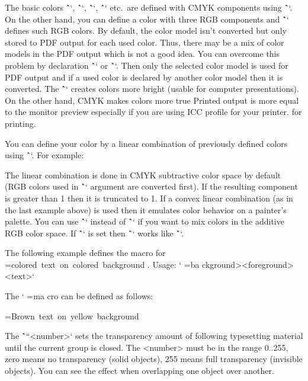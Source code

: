 {The basic colors \^`\Blue`, \^`\Red`, \^`\Cyan`, \^`\Yellow` etc.\ are defined
with CMYK components using \^`\setcmykcolor`.
On the other hand, you can define a color with three
RGB components and \^`\morecolors` defines such RGB colors.
By default, the color model isn't converted but only stored to
PDF output for each used color. Thus, there may be a mix of color
models in the PDF output which is not a good idea. You can overcome this
problem by declaration \^`\onlyrgb` or \^`\onlycmyk`. Then only the selected color
model is used for PDF output and if a used color is declared by another color
model then it is converted.
The \^`\onlyrgb` creates colors more bright (usable for computer
presentations). On the other hand, CMYK makes colors more true\fnote
{Printed output is more equal to the monitor preview especially if you are
using ICC profile for your printer.}
for printing.

You can define your color by a linear combination of previously defined colors using
\^``. For example:

\begtt
{} \myCyan {.3\Green + .5\Blue}  %
 \DarkBlue {\Blue + .4\Black}  %
 \myGreen{\Cyan+\Yellow}       %
{} \MyColor {.3\Orange+.5\Green+.2\Yellow}
\endtt
%
The linear combination is done in CMYK subtractive color space by default
(RGB colors used in \^`` argument are converted first).
If the resulting component is greater than 1 then it is truncated to 1.
If a convex linear combination (as in the last example above) is used then it
emulates color behavior on a painter's palette.
You can use \^`\rgbcolordef` instead of \^`` if you want to mix colors
in the additive RGB color space.
If \^`\onlyrgb` is set then \^`` works like \^`\rgbcolordef`.

\def\coloron#1#2#3{%
   \setbox0=\hbox{#2#3}\leavevmode
   \rlap{#1\strut \vrule width\wd0}
}
The following example defines the macro for
\coloron\Yellow\Brown{colored text on colored background}. Usage:
`\coloron<background><foreground>{<text>}`

The `\coloron` macro can be defined as follows:

\begtt
\def\coloron#1#2#3{%
   \setbox0=\hbox{#2#3}%
   \leavevmode \rlap{#1\strut \vrule width\wd0}
}
\coloron\Yellow\Brown{Brown text on yellow background}
\endtt

The \^`\transparency``<number>` sets the transparency amount of following
typesetting material until the current group is closed.
The <number> must be in the range 0..255,
zero means no transparency (solid objects), 255 means
full transparency (invisible objects). You can see the effect when
overlapping one object over another.


}
